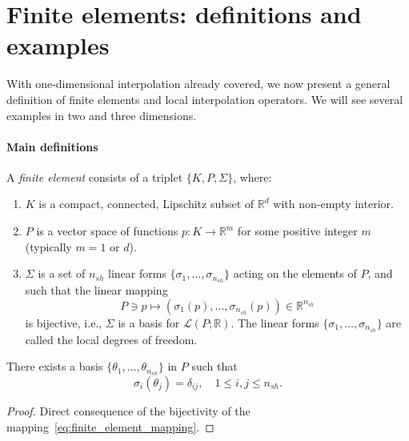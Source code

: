 \section{Finite elements: definitions and examples}\label{sec:finite-element-definitions}
With one-dimensional interpolation already covered, we now present a general definition of finite elements and local interpolation operators. We will see several examples in two and three dimensions. 

\paragraph{Main definitions}
\begin{definition}\label{def:finiteelements}
    A \emph{finite element} consists of a triplet $\{K, P, \Sigma\}$, where:
    \begin{enumerate}
        \item $K$ is a compact, connected, Lipschitz subset of $\mathbb{R}^d$ with non-empty interior.
        \item $P$ is a vector space of functions $p: K \rightarrow \mathbb{R}^m$ for some positive integer $m$ (typically $m = 1$ or $d$).
        \item $\Sigma$ is a set of $n_{sh}$ linear forms $\{\sigma_1, \dots, \sigma_{n_{sh}}\}$ acting on the elements of $P$, and such that the linear mapping
        \begin{equation}\label{eq:finite_element_mapping}
            P \ni p \mapsto (\sigma_1(p), \dots, \sigma_{n_{sh}}(p)) \in \mathbb{R}^{n_{sh}}
        \end{equation}
        is bijective, i.e., $\Sigma$ is a basis for $\mathcal{L}(P; \mathbb{R})$. The linear forms $\{\sigma_1, \dots, \sigma_{n_{sh}}\}$ are called the local degrees of freedom.
    \end{enumerate}
\end{definition}

\begin{lemma}\label{lemma:basis_from_bijectivity}
    There exists a basis $\{\theta_1, \dots, \theta_{n_{sh}}\}$ in $P$ such that
    \begin{equation}
        \sigma_i(\theta_j) = \delta_{ij}, \quad 1 \le i,j \le n_{sh}.
    \end{equation}
    \begin{proof}
        Direct consequence of the bijectivity of the mapping~\eqref{eq:finite_element_mapping}.
    \end{proof}
\end{lemma}

